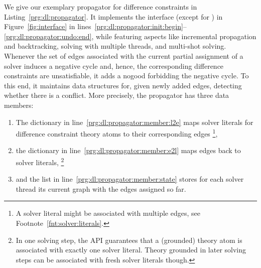
%
We give our exemplary propagator for difference constraints in Listing~\ref{prg:dl:propagator}.
%
It implements the  interface (except for ) in Figure~\ref{fig:interface} in
lines~\ref{prg:dl:propagator:init:begin}--\ref{prg:dl:propagator:undo:end},
while featuring aspects like
incremental propagation and backtracking,
solving with multiple threads, and
multi-shot solving.
Whenever the set of edges associated with the current partial assignment of a solver induces a negative cycle
and, hence, the corresponding difference constraints are unsatisfiable,
it adds a nogood forbidding the negative cycle.
%
To this end,
it maintains data structures for, given newly added edges,
detecting whether there is a conflict.
More precisely, the propagator has three data members:
\begin{enumerate}
\item
  The  dictionary in line~\ref{prg:dl:propagator:member:l2e} maps solver literals
  for difference constraint theory atoms to their corresponding edges%
  \footnote{A solver literal might be associated with multiple edges, see Footnote~\ref{fnt:solver:literals}.},
\item
  the  dictionary in line~\ref{prg:dl:propagator:member:e2l} maps edges back to solver literals,%
  \footnote{In one solving step, the \clingo{} API guarantees that a (grounded) theory atom is associated with exactly one solver literal.
  Theory grounded in later solving steps can be associated with fresh solver literals though.}
\item
  and the  list in line~\ref{prg:dl:propagator:member:state} stores for each solver thread its current graph
  with the edges assigned so far.
\end{enumerate}

